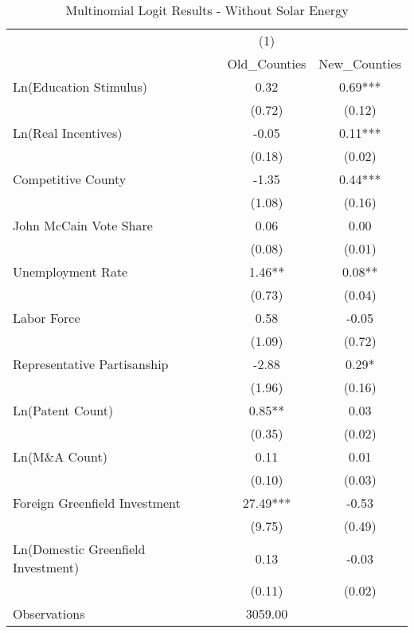 \begin{table}[!htbp]\centering
\def\sym#1{\ifmmode^{#1}\else\(^{#1}\)\fi}
\caption{Multinomial Logit Results - Without Solar Energy}
\begin{tabular}{l*{2}{c}}
\hline\hline
                    &         (1)   &               \\
                    &Old_Counties   &New_Counties   \\
\hline
Ln(Education Stimulus)&        0.32   &        0.69***\\
                    &      (0.72)   &      (0.12)   \\
Ln(Real Incentives) &       -0.05   &        0.11***\\
                    &      (0.18)   &      (0.02)   \\
Competitive County  &       -1.35   &        0.44***\\
                    &      (1.08)   &      (0.16)   \\
John McCain Vote Share&        0.06   &        0.00   \\
                    &      (0.08)   &      (0.01)   \\
Unemployment Rate   &        1.46** &        0.08** \\
                    &      (0.73)   &      (0.04)   \\
Labor Force         &        0.58   &       -0.05   \\
                    &      (1.09)   &      (0.72)   \\
Representative Partisanship&       -2.88   &        0.29*  \\
                    &      (1.96)   &      (0.16)   \\
Ln(Patent Count)    &        0.85** &        0.03   \\
                    &      (0.35)   &      (0.02)   \\
Ln(M\&A Count)      &        0.11   &        0.01   \\
                    &      (0.10)   &      (0.03)   \\
Foreign Greenfield Investment&       27.49***&       -0.53   \\
                    &      (9.75)   &      (0.49)   \\
Ln(Domestic Greenfield Investment)&        0.13   &       -0.03   \\
                    &      (0.11)   &      (0.02)   \\
\hline
Observations        &     3059.00   &               \\

\end{tabular}
\end{table}
